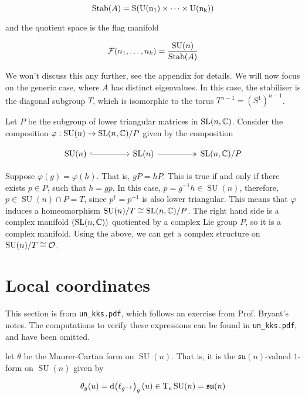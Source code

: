 \documentclass{article}
\DeclareMathOperator{\SU}{SU}
\newcommand{\su}{\mathfrak{su}}
\begin{document}
\[\operatorname{Stab}(A) = \rm S(\rm U(n_1) \times \cdots \times \rm U(n_k))\]

and the quotient space is the flag manifold

\[\mcF(n_1, \dots, n_k) = \frac{\SU(n)}{\Stab(A)}\]

We won't discuss this any further, see the appendix for details. We will now focus on the generic case, where \(A\) has distinct eigenvalues. In this case, the stabiliser is the diagonal subgroup \(T\), which is isomorphic to the torus \(T^{n-1} = (S^1)^{n-1}\).

Let \(P\) be the subgroup of lower triangular matrices in \(\operatorname{SL}(n, \mathbb{C})\). Consider the composition \(\varphi : \SU(n) \to \SL(n, \C)/P\) given by the composition 

\[\begin{tikzcd}
	{\SU(n)} && {\SL(n)} && {\SL(n, \C)/P}
	\arrow[hook, from=1-1, to=1-3]
	\arrow[two heads, from=1-3, to=1-5]
\end{tikzcd}\]

Suppose \(\varphi(g) = \varphi(h)\). That is, \(gP = hP\). This is true if and only if there exists \(p \in P\), such that \(h = gp\). In this case, \(p = g^{-1}h \in \SU(n)\), therefore, \(p \in \SU(n) \cap P = T\), since \(p^\dagger = p^{-1}\) is also lower triangular. This means that \(\varphi\) induces a homeomorphism \(\SU(n)/T \cong \SL(n, \C)/P\). The right hand side is a complex manifold \((\operatorname{SL}(n, \mathbb{C}))\) quotiented by a complex Lie group \(P\), so it is a complex manifold. Using the above, we can get a complex structure on \(\SU(n)/T \cong \mcO\).

\section{Local coordinates}

This section is from \texttt{un\_kks.pdf}, which follows an exercise from Prof. Bryant's notes. The computations to verify these expressions can be found in \texttt{un\_kks.pdf}, and have been omitted.

let \(\theta\) be the Maurer-Cartan form on \(\SU(n)\). That is, it is the \(\su(n)\)-valued \(1\)-form on \(\SU(n)\) given by

\[\theta_g(u) = \dd (\ell_{g^{-1}})_g(u) \in \TT_e\SU(n) = \su(n)\]
\end{document}
